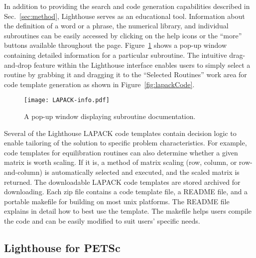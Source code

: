 \documentclass{sig-alternate}
\begin{document}
In addition to providing the search and code generation capabilities described in Sec.~\ref{sec:method}, Lighthouse serves as an educational tool.
Information about the definition of a word or a phrase, the numerical library, and individual subroutines can be easily accessed by clicking on the help
icons or the ``more'' buttons available throughout the page. Figure~\ref{fig:document} shows a pop-up window containing
detailed information for a particular subroutine. The intuitive drag-and-drop feature within the Lighthouse interface
enables users to simply select a routine by grabbing it and dragging it to the ``Selected Routines'' work area for code template
generation as shown in Figure~\ref{fig:lapackCode}.

\begin{figure}[ht]
\centering
\texttt{[image: LAPACK-info.pdf]}
\vspace{-5pt}
\caption{A pop-up window displaying subroutine documentation.}
\label{fig:document}
\end{figure}



Several of the Lighthouse LAPACK code templates contain decision logic to enable tailoring of the solution to specific problem characteristics.
For example, code templates for equilibration routines can also determine whether a given matrix is worth scaling. If it is, a method
of matrix scaling (row, column, or row-and-column) is automatically selected and executed, and the scaled matrix is returned.
The downloadable LAPACK code templates are stored archived for downloading. Each zip file contains a code template file, a README file, and a portable
makefile for building on most unix platforms.
The README file explains in detail how to best use the template. The makefile helps users compile the code and can be easily modified to
suit users' specific needs.



\subsection{Lighthouse for PETSc}
\end{document}
